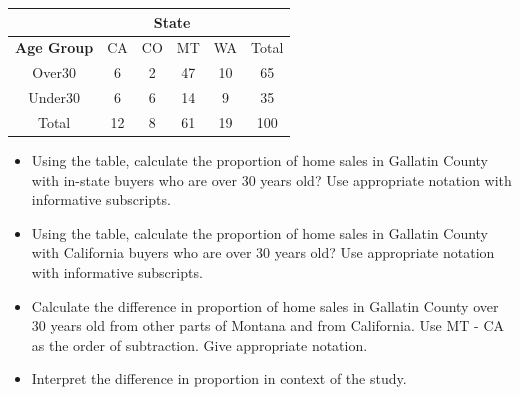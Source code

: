 \documentclass[
]{report}
\providecommand{\tightlist}{%
  \setlength{\itemsep}{0pt}\setlength{\parskip}{0pt}}
\begin{document}

\begin{center}
\begingroup
\setlength{\tabcolsep}{14pt} %
\renewcommand{\arraystretch}{2} %
\begin{tabular}{|c|c|c|c|c|c|}
\hline
 & \multicolumn{4}{|c|}{\textbf{State}} & \\ \hline
\textbf{Age Group} & CA & CO & MT & WA & Total \\ \hline
 Over30 & 6 & 2 & 47 & 10 & 65 \\ \hline
 Under30 & 6 & 6 & 14 & 9 & 35 \\ \hline
 Total & 12 & 8 & 61 & 19 & 100\\ \hline
\end{tabular}
\endgroup
\end{center}

\begin{itemize}
\tightlist
\item
  Using the table, calculate the proportion of home sales in Gallatin County with in-state buyers who are over 30 years old? Use appropriate notation with informative subscripts.
\end{itemize}

\vspace{0.4in}

\begin{itemize}
\tightlist
\item
  Using the table, calculate the proportion of home sales in Gallatin County with California buyers who are over 30 years old? Use appropriate notation with informative subscripts.
\end{itemize}

\vspace{0.4in}

\begin{itemize}
\tightlist
\item
  Calculate the difference in proportion of home sales in Gallatin County over 30 years old from other parts of Montana and from California. Use MT - CA as the order of subtraction. Give appropriate notation.
\end{itemize}

\vspace{0.4in}

\begin{itemize}
\tightlist
\item
  Interpret the difference in proportion in context of the study.
\end{itemize}
\end{document}
